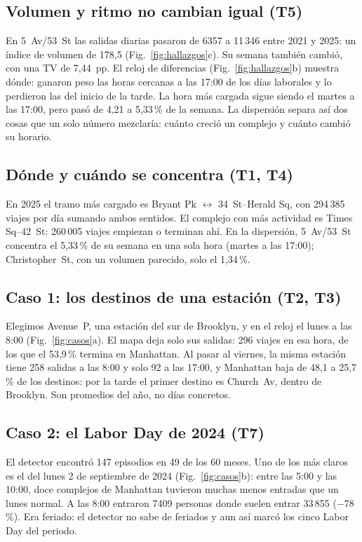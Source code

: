 \documentclass[conference,a4paper]{IEEEtran}
\begin{document}
\subsection{Volumen y ritmo no cambian igual (T5)}
En 5~Av/53~St las salidas diarias pasaron de 6357 a 11\,346 entre 2021 y 2025: un índice de volumen de 178,5 (Fig.~\ref{fig:hallazgos}c). Su semana también cambió, con una TV de 7,44~pp. El reloj de diferencias (Fig.~\ref{fig:hallazgos}b) muestra dónde: ganaron peso las horas cercanas a las 17:00 de los días laborales y lo perdieron las del inicio de la tarde. La hora más cargada sigue siendo el martes a las 17:00, pero pasó de 4,21 a 5,33\,\% de la semana. La dispersión separa así dos cosas que un solo número mezclaría: cuánto creció un complejo y cuánto cambió su horario.

\subsection{Dónde y cuándo se concentra (T1, T4)}
En 2025 el tramo más cargado es Bryant Pk $\leftrightarrow$ 34~St--Herald Sq, con 294\,385 viajes por día sumando ambos sentidos. El complejo con más actividad es Times Sq--42~St: 260\,005 viajes empiezan o terminan ahí. En la dispersión, 5~Av/53~St concentra el 5,33\,\% de su semana en una sola hora (martes a las 17:00); Christopher~St, con un volumen parecido, solo el 1,34\,\%.

\subsection{Caso 1: los destinos de una estación (T2, T3)}
Elegimos Avenue~P, una estación del sur de Brooklyn, y en el reloj el lunes a las 8:00 (Fig.~\ref{fig:casos}a). El mapa deja solo sus salidas: 296 viajes en esa hora, de los que el 53,9\,\% termina en Manhattan. Al pasar al viernes, la misma estación tiene 258 salidas a las 8:00 y solo 92 a las 17:00, y Manhattan baja de 48,1 a 25,7\,\% de los destinos: por la tarde el primer destino es Church~Av, dentro de Brooklyn. Son promedios del año, no días concretos.

\subsection{Caso 2: el Labor Day de 2024 (T7)}
El detector encontró 147 episodios en 49 de los 60 meses. Uno de los más claros es el del lunes 2 de septiembre de 2024 (Fig.~\ref{fig:casos}b): entre las 5:00 y las 10:00, doce complejos de Manhattan tuvieron muchas menos entradas que un lunes normal. A las 8:00 entraron 7409 personas donde suelen entrar 33\,855 ($-$78\,\%). Era feriado: el detector no sabe de feriados y aun así marcó los cinco Labor Day del periodo.
\end{document}
